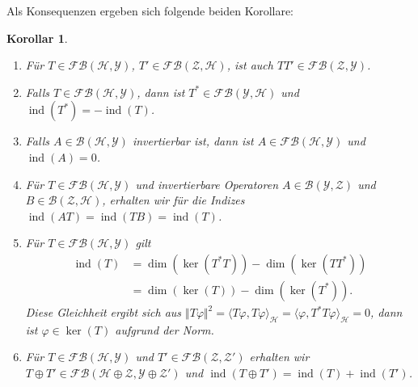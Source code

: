 \documentclass[11pt, hidelinks]{article}
\newcommand{\h}{\mathcal{H}}
\newcommand{\ind}{\operatorname{ind}}
\numberwithin{conj}{section}
\newtheorem{corollary}[conj]{Korollar}
\begin{document}
Als Konsequenzen ergeben sich folgende beiden Korollare:

\begin{corollary}\noindent
    \begin{enumerate}
        \item Für $T \in \mathcal{FB}(\h,\mathcal{Y})$, $T' \in \mathcal{FB}(\mathcal{Z},\h)$, ist auch $TT'\in \mathcal{FB}(\mathcal{Z},\mathcal{Y})$.
        \item Falls $T \in \mathcal{FB}(\h,\mathcal{Y})$, dann ist $T^\ast \in \mathcal{FB}(\mathcal{Y},\h)$ und $\ind(T^\ast) = - \ind(T)$.
        \item Falls $A \in \mathcal{B}(\h,\mathcal{Y})$ invertierbar ist, dann ist $A \in \mathcal{FB}(\h,\mathcal{Y})$ und $\ind(A) = 0$.
        \item Für $T \in \mathcal{FB}(\h,\mathcal{Y})$ und invertierbare Operatoren $A \in \mathcal{B}(\mathcal{Y},\mathcal{Z})$ und $B \in \mathcal{B}(\mathcal{Z},\h)$, erhalten wir für die Indizes $\ind(AT) = \ind(TB) = \ind(T)$.
        \item Für $T \in \mathcal{FB}(\h,\mathcal{Y})$ gilt
        \begin{align}
            \ind(T) &= \dim(\ker(T^\ast T)) - \dim(\ker(TT^\ast)) \\
                    &= \dim(\ker(T)) - \dim(\ker(T^\ast)).
        \end{align}
        Diese Gleichheit ergibt sich aus $\Vert T\varphi \Vert^2 = \langle T\varphi, T\varphi \rangle_\h = \langle \varphi, T^\ast T\varphi \rangle_\h = 0$, dann ist $\varphi \in \ker(T)$ aufgrund der Norm.
        \item Für $T \in \mathcal{FB}(\h,\mathcal{Y})$ und $T' \in \mathcal{FB}(\mathcal{Z},\mathcal{Z}')$ erhalten wir $T \oplus T' \in \mathcal{FB}(\h \oplus \mathcal{Z}, \mathcal{Y} \oplus \mathcal{Z}')$ und $\ind(T \oplus T') = \ind(T) + \ind(T')$.
    \end{enumerate}
\end{corollary}
\end{document}
